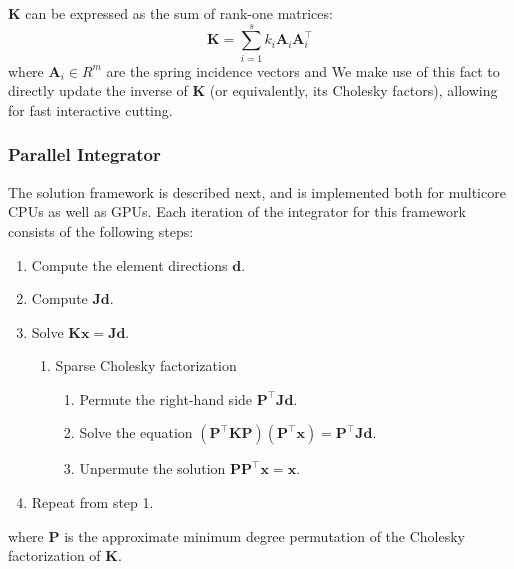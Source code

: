 $\mathbf{K}$ can be expressed as the sum of rank-one matrices: 
\begin{equation}
  \mathbf{K} = \sum_{i = 1}^s k_i\mathbf{A}_i\mathbf{A}_i^\intercal
\end{equation}
where $\mathbf{A}_i \in R^{m}$ are the spring incidence vectors and 
We  make use of this fact to directly update the inverse of $\mathbf{K}$ (or
equivalently, its Cholesky factors), allowing for fast interactive cutting.


\subsubsection{Parallel Integrator}
The solution framework is described next, and is implemented both for multicore CPUs as well as GPUs.  
Each iteration of the integrator for this framework consists of the following steps:
\begin{enumerate}
  \item Compute the element directions $\mathbf{d}$.
  \item Compute $\mathbf{Jd}$.
  \item Solve $\mathbf{Kx} = \mathbf{Jd}$.
  \begin{enumerate}
    \item Sparse Cholesky factorization
    \begin{enumerate}
      \item Permute the right-hand side $\mathbf{P^\intercal Jd}$.
      \item Solve the equation $\mathbf{(P^\intercal KP)(P^\intercal x)} = \mathbf{P^\intercal Jd}$.
      \item Unpermute the solution $\mathbf{PP^\intercal x} = \mathbf{x}$.
    \end{enumerate}
  \end{enumerate}
 
  \item Repeat from step 1.
\end{enumerate}
where $\mathbf{P}$ is the approximate minimum degree permutation of the
Cholesky factorization of $\mathbf{K}$. 

